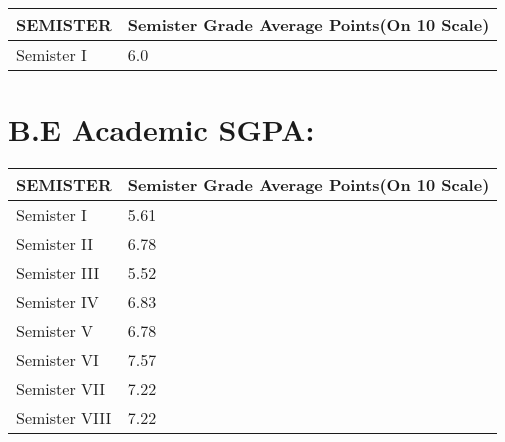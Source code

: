 \documentclass[a4paper,10pt]{article}
\begin{document}
\begin{tabu} to 0.8\textwidth { | X[l] | X[l] |  }
 \hline
 
 \Large
 SEMISTER  & \Large
  Semister Grade Average Points(On 10 Scale)   \\
\hline
\large Semister I & 6.0   \\
 \hline
 

\end{tabu}











\vspace{15mm}


\section{B.E Academic SGPA:}

\begin{tabu} to 0.8\textwidth { | X[l] | X[l] |  }
 \hline
 
 \Large
 SEMISTER  & \Large
  Semister Grade Average Points(On 10 Scale)   \\
\hline
\large Semister I & 5.61   \\
 \hline
 
\large Semister II & 6.78  \\
 \hline
 
 \large Semister III  &  5.52 \\
 \hline
 
\large  Semister IV & 6.83  \\
 \hline
 
\large Semister  V &   6.78 \\
 \hline
 
\large Semister VI &   7.57\\
 \hline
 
\large Semister VII  & 7.22  \\
 \hline
 
 \large Semister VIII & 7.22  \\
 \hline

\end{tabu}
%
  
\end{document}
